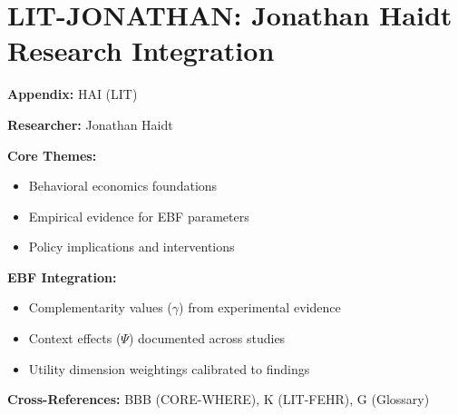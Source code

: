 %
%

\chapter{LIT-JONATHAN: Jonathan Haidt Research Integration}
\label{app:hai}

\begin{abstract}
This appendix integrates the research contributions of Jonathan Haidt into the
Evidence-Based Framework. It documents key papers, core findings, and their
integration with EBF dimensions including complementarity parameters ($\gamma$),
context factors ($\Psi$), and utility dimensions.
\end{abstract}

\begin{tcolorbox}[colback=blue!5!white, colframe=blue!75!black,
    title=Quick Reference: Jonathan Haidt Research]

\textbf{Appendix:} HAI (LIT)

\textbf{Researcher:} Jonathan Haidt

\textbf{Core Themes:}
\begin{itemize}[nosep]
\item Behavioral economics foundations
\item Empirical evidence for EBF parameters
\item Policy implications and interventions
\end{itemize}

\textbf{EBF Integration:}
\begin{itemize}[nosep]
\item Complementarity values ($\gamma$) from experimental evidence
\item Context effects ($\Psi$) documented across studies
\item Utility dimension weightings calibrated to findings
\end{itemize}

\textbf{Cross-References:} BBB (CORE-WHERE), K (LIT-FEHR), G (Glossary)
\end{tcolorbox}

